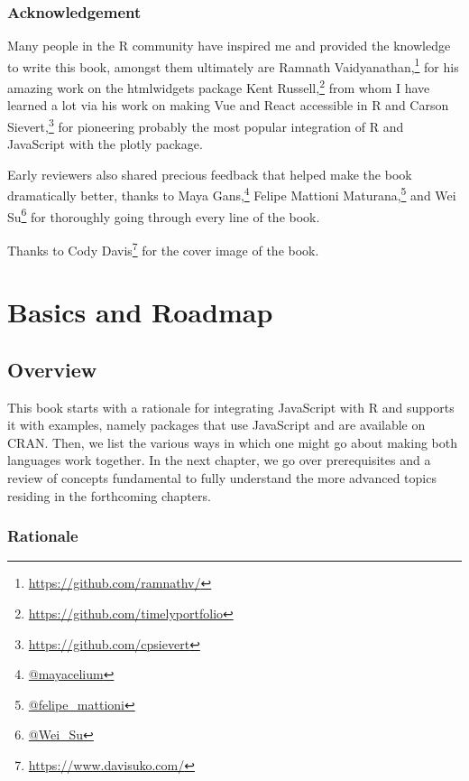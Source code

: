 \documentclass[10pt,]{krantz}
\renewcommand{\href}[2]{#2\footnote{\url{#1}}}
\begin{document}
\hypertarget{acknowledgement}{%
\section*{Acknowledgement}\label{acknowledgement}}


Many people in the R community have inspired me and provided the knowledge to write this book, amongst them ultimately are \href{https://github.com/ramnathv/}{Ramnath Vaidyanathan,} for his amazing work on the htmlwidgets \citep{R-htmlwidgets} package \href{https://github.com/timelyportfolio}{Kent Russell,} from whom I have learned a lot via his work on making Vue and React accessible in R and \href{https://github.com/cpsievert}{Carson Sievert,} for pioneering probably the most popular integration of R and JavaScript with the plotly \citep{R-plotly} package.

Early reviewers also shared precious feedback that helped make the book dramatically better, thanks to \href{@mayacelium}{Maya Gans,} \href{@felipe_mattioni}{Felipe Mattioni Maturana,} and \href{@Wei_Su}{Wei Su} for thoroughly going through every line of the book.

Thanks to \href{https://www.davisuko.com/}{Cody Davis} for the cover image of the book.

\mainmatter

\hypertarget{part-basics-and-roadmap}{%
\part{Basics and Roadmap}\label{part-basics-and-roadmap}}

\hypertarget{intro-overview}{%
\chapter{Overview}\label{intro-overview}}

This book starts with a rationale for integrating JavaScript with R and supports it with examples, namely packages that use JavaScript and are available on CRAN. Then, we list the various ways in which one might go about making both languages work together. In the next chapter, we go over prerequisites and a review of concepts fundamental to fully understand the more advanced topics residing in the forthcoming chapters.

\hypertarget{intro-overview-rationale}{%
\section{Rationale}\label{intro-overview-rationale}}
\end{document}
